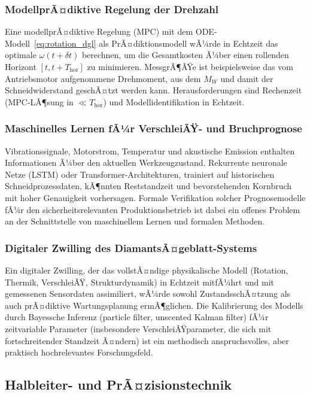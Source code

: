 ﻿\documentclass[a4paper,12pt]{article}
\theoremstyle{definition}
\begin{document}
\subsubsection{ModellprÃ¤diktive Regelung der Drehzahl}

Eine modellprÃ¤diktive Regelung (MPC) mit dem ODE-Modell~\eqref{eq:rotation_dgl}
als PrÃ¤diktionsmodell wÃ¼rde in Echtzeit das optimale $\omega(t+\delta t)$ berechnen,
um die Gesamtkosten Ã¼ber einen rollenden Horizont $[t, t+T_{\mathrm{hor}}]$ zu minimieren.
MessgrÃ¶ÃŸe ist beispielsweise das vom Antriebsmotor aufgenommene Drehmoment, aus dem
$M_W$ und damit der Schneidwiderstand geschÃ¤tzt werden kann. Herausforderungen sind
Rechenzeit (MPC-LÃ¶sung in $\ll T_{\mathrm{hor}}$) und Modellidentifikation in Echtzeit.

\subsubsection{Maschinelles Lernen fÃ¼r VerschleiÃŸ- und Bruchprognose}

Vibrationssignale, Motorstrom, Temperatur und akustische Emission enthalten
Informationen Ã¼ber den aktuellen Werkzeugzustand. Rekurrente neuronale Netze (LSTM)
oder Transformer-Architekturen, trainiert auf historischen Schneidprozessdaten,
kÃ¶nnten Reststandzeit und bevorstehenden Kornbruch mit hoher Genauigkeit vorhersagen.
Formale Verifikation solcher Prognosemodelle fÃ¼r den sicherheitsrelevanten Produktionsbetrieb
ist dabei ein offenes Problem an der Schnittstelle von maschinellem Lernen und
formalen Methoden.

\subsubsection{Digitaler Zwilling des DiamantsÃ¤geblatt-Systems}

Ein digitaler Zwilling, der das vollstÃ¤ndige physikalische Modell (Rotation,
Thermik, VerschleiÃŸ, Strukturdynamik) in Echtzeit mitfÃ¼hrt und mit gemessenen
Sensordaten assimiliert, wÃ¼rde sowohl ZustandsschÃ¤tzung als auch prÃ¤diktive
Wartungsplanung ermÃ¶glichen. Die Kalibrierung des Modells durch Bayessche
Inferenz (particle filter, unscented Kalman filter) fÃ¼r zeitvariable Parameter
(insbesondere VerschleiÃŸparameter, die sich mit fortschreitender Standzeit Ã¤ndern)
ist ein methodisch anspruchsvolles, aber praktisch hochrelevantes Forschungsfeld.

\subsection{Halbleiter- und PrÃ¤zisionstechnik}
\end{document}
